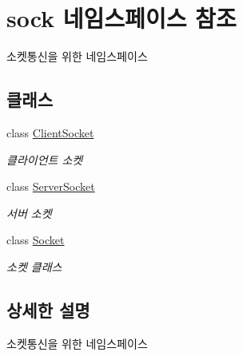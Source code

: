 \hypertarget{namespacesock}{}\section{sock 네임스페이스 참조}
\label{namespacesock}


소켓통신을 위한 네임스페이스  


\subsection*{클래스}
\begin{DoxyCompactItemize}
\item 
class \hyperlink{classsock_1_1_client_socket}{Client\+Socket}
\begin{DoxyCompactList}\small\item\em 클라이언트 소켓 \end{DoxyCompactList}\item 
class \hyperlink{classsock_1_1_server_socket}{Server\+Socket}
\begin{DoxyCompactList}\small\item\em 서버 소켓 \end{DoxyCompactList}\item 
class \hyperlink{classsock_1_1_socket}{Socket}
\begin{DoxyCompactList}\small\item\em 소켓 클래스 \end{DoxyCompactList}\end{DoxyCompactItemize}


\subsection{상세한 설명}
소켓통신을 위한 네임스페이스 
